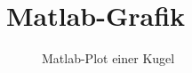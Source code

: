 \documentclass
[
a4paper,	%
11pt,		%
BCOR1cm,	%
DIV=14,		%
bibliography=totoc,	%
ngerman
]{scrartcl}
\title{\myTitle}
\author{\myAuthor}
\date{\myDate}
\begin{document}
\maketitle

\begin{abstract}
	Eine Kugel, erstellt mit Matlab
\end{abstract}

\tableofcontents


\listoffigures


\section{Matlab-Grafik}
\begin{figure}[h!t]
	\centering 
	\newlength\figureheight 
	\newlength\figurewidth 
	\setlength\figureheight{6cm} 
	\setlength\figurewidth{6cm} 
	\caption{Matlab-Plot einer Kugel}
	 
	\label{fig:sphere} 
	\end{figure}
\end{document}
